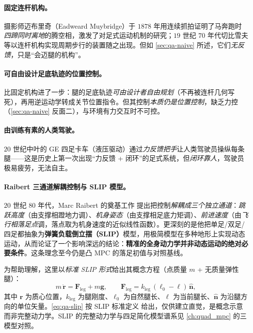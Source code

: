 \paragraph{ 固定连杆机构。}
摄影师迈布里奇（Eadweard Muybridge）于 $1878$ 年用连续抓拍证明了马奔跑时\emph{四蹄同时离地}的腾空相，激发了对足式运动机制的研究；$19$ 世纪 $70$ 年代切比雪夫等以连杆机构实现周期步行的装置随之出现。但如 \cref{sec:qa-naive} 所述，它们\emph{无反馈}，只是“会迈腿的机构”\cite{yu2021quadruped}。

\paragraph{ 可自由设计足底轨迹的位置控制。}
比固定机构进了一步：腿的足底轨迹\emph{可由设计者自由规划}（不再被连杆几何写死），再用逆运动学转成关节位置指令。但其控制\emph{本质仍是位置控制}，缺乏力控（\cref{sec:qa-naive} 反面二），与环境有力交互时不可控\cite{yu2021quadruped}。

\paragraph{ 由训练有素的人类驾驶。}
$20$ 世纪中叶的 GE 四足卡车（液压驱动）通过\emph{力反馈把手}让人类驾驶员操纵每条腿——这是历史上第一次出现“力反馈 + 闭环”的足式系统，但\emph{闭环靠人}，驾驶员极易疲劳，无法自主\cite{yu2021quadruped}。

\paragraph{ Raibert 三通道解耦控制与 SLIP 模型。}
$20$ 世纪 $80$ 年代，Marc Raibert 的奠基工作\cite{raibert1986legged} 提出把控制\emph{解耦成三个独立通道}：\emph{跳跃高度}（由支撑相蹬地力调）、\emph{机身姿态}（由支撑相足底力矩调）、\emph{前进速度}（由\emph{飞行相落足点}调，落点取为机身速度的近似线性函数）。更深刻的是他把单足/双足/四足都抽象为\textbf{弹簧负载倒立摆（SLIP）}模型，用极简模型在多种地形上实现动态运动，从而论证了一个影响深远的结论：\textbf{精准的全身动力学并非动态运动的绝对必要条件}\cite{yu2021quadruped}。这条理念至今仍是凸 MPC 的落足初值与对照基线。

\begin{remark}\label{rem:qa-slip}
为帮助理解，这里以\emph{标准 SLIP 形式}给出其概念方程（点质量 $m$ + 无质量弹性腿）：
\begin{equation}
  m\,\ddot{\boldsymbol r}=\boldsymbol F_{\mathrm{leg}}+m\boldsymbol g,
  \qquad
  \boldsymbol F_{\mathrm{leg}}=k_{\mathrm{leg}}\,(\ell_0-\ell)\,\hat{\boldsymbol n},
  \label{eq:qa-slip}
\end{equation}
其中 $\boldsymbol r$ 为质心位置，$k_{\mathrm{leg}}$ 为腿刚度、$\ell_0$ 为自然腿长、$\ell$ 为当前腿长、$\hat{\boldsymbol n}$ 为沿腿方向的单位矢量。\cref{eq:qa-slip} 按 SLIP 标准定义\cite{raibert1986legged} 给出，仅供建立直觉，是概念示意而非完整动力学。SLIP 的完整动力学与四足简化模型谱系见 \cref{ch:quad_mpc} 的三模型对照。
\end{remark}

